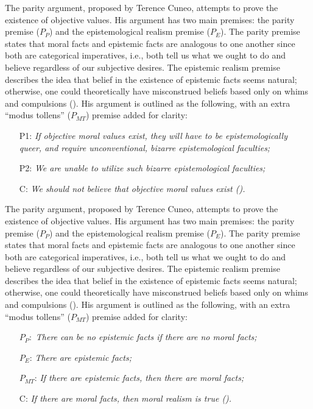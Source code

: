 \documentclass[12pt, a4paper, twoside]{article}
\begin{document}
The parity argument, proposed by Terence Cuneo, attempts to prove the existence of objective values. His argument has two main premises: the parity premise ($P_P$) and the epistemological realism premise ($P_E$). The parity premise states that moral facts and epistemic facts are analogous to one another since both are categorical imperatives, i.e., both tell us what we ought to do and believe regardless of our subjective desires. The epistemic realism premise describes the idea that belief in the existence of epistemic facts seems natural; otherwise, one could theoretically have misconstrued beliefs based only on whims and compulsions (\cite[pp.\ 52–62]{cuneo2010normative}). His argument is outlined as the following, with an extra “modus tollens” ($P_{MT}$) premise added for clarity:
\begin{enumerate}

	\item[P1:] \textit{If objective moral values exist, they will have to be epistemologically queer, and require unconventional, bizarre epistemological faculties;}

	\item[P2:] \textit{We are unable to utilize such bizarre epistemological faculties;}

	\item[C:] \textit{We should not believe that objective moral values exist (\cites[pp.\ 38–41]{mackie1978ethics}[pp.\ 1–2]{lillehammer2019queerness}).}

\end{enumerate}

The parity argument, proposed by Terence Cuneo, attempts to prove the existence of objective values. His argument has two main premises: the parity premise ($P_P$) and the epistemological realism premise ($P_E$). The parity premise states that moral facts and epistemic facts are analogous to one another since both are categorical imperatives, i.e., both tell us what we ought to do and believe regardless of our subjective desires. The epistemic realism premise describes the idea that belief in the existence of epistemic facts seems natural; otherwise, one could theoretically have misconstrued beliefs based only on whims and compulsions (\cite[pp.\ 52–62]{cuneo2010normative}). His argument is outlined as the following, with an extra “modus tollens” ($P_{MT}$) premise added for clarity: 
\begin{enumerate}

\item[$P_P:$] \textit{There can be no epistemic facts if there are no moral facts;}

\item[$P_E$:] \textit{There are epistemic facts;}

\item[$P_{MT}$:] \textit{If there are epistemic facts, then there are moral facts;}

\item[C:] \textit{If there are moral facts, then moral realism is true (\cite[p.\ 1]{rutten2010parity}).}

\end{enumerate}
\end{document}
